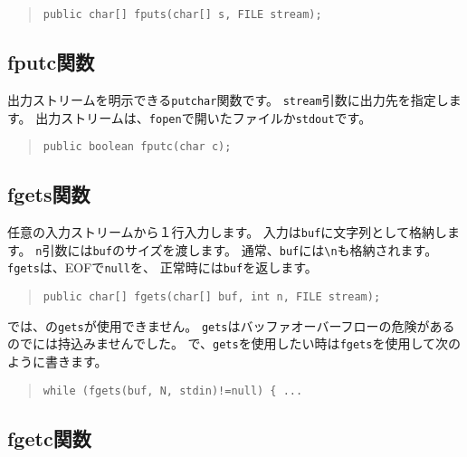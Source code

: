 \begin{quote}
\begin{verbatim}
public char[] fputs(char[] s, FILE stream);
\end{verbatim}
\end{quote}

\subsection{fputc関数}

出力ストリームを明示できる\verb/putchar/関数です。
\verb/stream/引数に出力先を指定します。
出力ストリームは、\verb/fopen/で開いたファイルか\verb/stdout/です。

\begin{quote}
\begin{verbatim}
public boolean fputc(char c);
\end{verbatim}
\end{quote}

\subsection{fgets関数}

任意の入力ストリームから１行入力します。
入力は\verb/buf/に文字列として格納します。
\verb/n/引数には\verb/buf/のサイズを渡します。
通常、\verb/buf/には\verb/\n/も格納されます。
\verb/fgets/は、EOFで\verb/null/を、
正常時には\verb/buf/を返します。

\begin{quote}
\begin{verbatim}
public char[] fgets(char[] buf, int n, FILE stream);
\end{verbatim}
\end{quote}

\cmm では、\cl の\verb/gets/が使用できません。
\verb/gets/はバッファオーバーフローの危険があるので\cmm には持込みませんでした。
\cmm で、\verb/gets/を使用したい時は\verb/fgets/を使用して次のように書きます。

\begin{quote}
\begin{verbatim}
while (fgets(buf, N, stdin)!=null) { ...
\end{verbatim}
\end{quote}


\subsection{fgetc関数}

